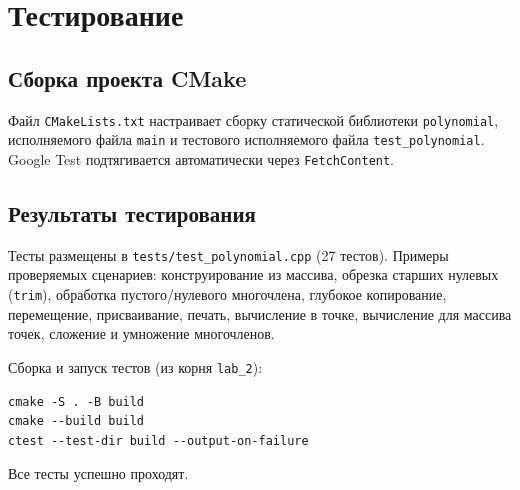 \section{Тестирование}

\subsection{Сборка проекта CMake}

Файл \texttt{CMakeLists.txt} настраивает сборку статической библиотеки \texttt{polynomial}, исполняемого файла \texttt{main} и тестового исполняемого файла \texttt{test\_polynomial}. Google Test подтягивается автоматически через \texttt{FetchContent}.



\subsection{Результаты тестирования}

Тесты размещены в \texttt{tests/test\_polynomial.cpp} (27 тестов). Примеры проверяемых сценариев: конструирование из массива, обрезка старших нулевых (\texttt{trim}), обработка пустого/нулевого многочлена, глубокое копирование, перемещение, присваивание, печать, вычисление в точке, вычисление для массива точек, сложение и умножение многочленов.

Сборка и запуск тестов (из корня \texttt{lab\_2}):

\begin{verbatim}
cmake -S . -B build
cmake --build build
ctest --test-dir build --output-on-failure
\end{verbatim}

Все тесты успешно проходят.
